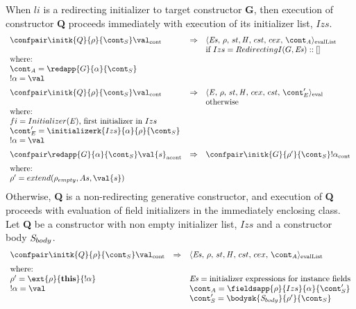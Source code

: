 \documentclass{article}
\begin{document}
\noindent
When $li$ is a redirecting initializer to target constructor \textbf{G}, then execution of constructor \textbf{Q} proceeds immediately with execution of its initializer list, $Izs$.
\[
  \begin{array}{lcl}
	\contconf{\initk{Q}{\env}{\scont}}{\val}
	& \Rightarrow &
	\evallistconf{\exprs}{\env}{\strace}{\cstrace}{\cex}{\acont}\\	
	&&
	\textrm{if } Izs = RedirectingI(G, \exprs) :: []\\
	\textrm{where:}\\
	\acont = \redapp{G}{\loc}{\scont}\\
	\deref{\loc} = \val
	\\[2mm]

	\contconf{\initk{Q}{\env}{\scont}}{\val}
	& \Rightarrow &
	\evalconf{\expr}{\env}{st}{cex}{cst}{\econt'}\\
	&&
	\textrm{otherwise}\\
	\textrm{where:}\\

	fi = Initializer(\expr) \textrm{, first initializer in }Izs\\
	\econt' = \initializerk{Izs}{\loc}{\env}{\scont}\\
	\deref{\loc} = \val\\[2mm]

	\acontconf{\redapp{G}{\loc}{\scont}}{\val{s}}
	& \Rightarrow &
	\contconf{\initk{G}{\env'}{\scont}}{\deref{\loc}}\\[2mm]
	\textrm{where:}\\
	\env' = extend(\env_{empty}, \formals, \val{s})
  \end{array}
\]
\noindent
Otherwise, \textbf{Q} is a non-redirecting generative constructor, and execution of \textbf{Q} proceeds with evaluation of field initializers in the immediately enclosing class.
\noindent
Let \textbf{Q} be a constructor with non empty initializer list, $Izs$ and a constructor body $\mathit{S}_{body}$.
\[
  \begin{array}{lcl}
	\contconf{\initk{Q}{\env}{\scont}}{\val}
	& \Rightarrow &
	\evallistconf{\exprs}{\env}{\strace}{\cstrace}{\cex}{\acont}\\[2mm]

	\textrm{where:}\\
	\env' = \ext{\env}{\mathbf{this}}{\deref{\loc}}
	&&
	\exprs = \textrm{initializer expressions for instance fields}\\
	\deref{\loc} = \val
	&&
	\acont = \fieldsapp{\env}{Izs}{\loc}{\scont'}\\
	&&
	\scont' = \bodysk{\stmt_{body}}{\env'}{\scont}
  \end{array}
\]
\end{document}
